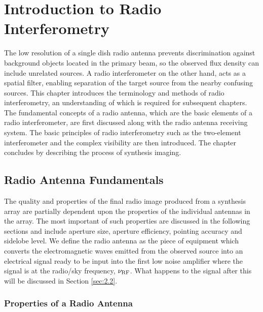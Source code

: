 

\chapter{Introduction to Radio Interferometry} \label{chap:2}
The low resolution of a single dish radio antenna prevents discrimination against background objects located in the primary beam, so the observed flux density can include unrelated sources. A radio interferometer on the other hand, acts as a spatial filter, enabling separation of the target source from the nearby confusing sources. This chapter introduces the terminology and methods of radio interferometry, an understanding of which is required for  subsequent chapters. The fundamental concepts of a radio antenna, which are the basic elements of a radio interferometer, are first discussed along with the radio antenna receiving system. The basic principles of radio interferometry such as the two-element interferometer and the complex visibility are then introduced. The chapter concludes by describing the process of synthesis imaging.

\pagebreak

\section{Radio Antenna Fundamentals}\label{sec:2.1}

The quality and properties of the final radio image produced from a synthesis array are partially dependent upon the properties of the individual antennas in the array. The most important of such properties are discussed in the following sections and include aperture size, aperture efficiency, pointing accuracy and sidelobe level. We define the radio antenna as the piece of equipment which converts the electromagnetic waves emitted from the observed source into an electrical signal ready to be input into the first low noise amplifier where the signal is at the radio/sky frequency, $\nu _{\rm{RF}}$. What happens to the signal after this will be discussed in Section \ref{sec:2.2}.

\subsection{Properties of a Radio Antenna}\label{subsec:2.1.1}

